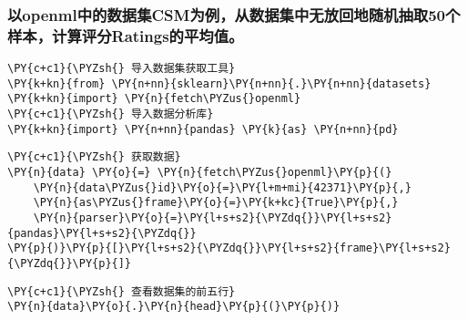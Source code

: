     \hypertarget{ux4ee5openmlux4e2dux7684ux6570ux636eux96c6csmux4e3aux4f8bux4eceux6570ux636eux96c6ux4e2dux65e0ux653eux56deux5730ux968fux673aux62bdux53d650ux4e2aux6837ux672cux8ba1ux7b97ux8bc4ux5206ratingsux7684ux5e73ux5747ux503c}{%
\subsubsection{以openml中的数据集CSM为例，从数据集中无放回地随机抽取50个样本，计算评分Ratings的平均值。}\label{ux4ee5openmlux4e2dux7684ux6570ux636eux96c6csmux4e3aux4f8bux4eceux6570ux636eux96c6ux4e2dux65e0ux653eux56deux5730ux968fux673aux62bdux53d650ux4e2aux6837ux672cux8ba1ux7b97ux8bc4ux5206ratingsux7684ux5e73ux5747ux503c}}

    \begin{tcolorbox}[breakable, size=fbox, boxrule=1pt, pad at break*=1mm,colback=cellbackground, colframe=cellborder]
\begin{Verbatim}[commandchars=\\\{\}]
\PY{c+c1}{\PYZsh{} 导入数据集获取工具}
\PY{k+kn}{from} \PY{n+nn}{sklearn}\PY{n+nn}{.}\PY{n+nn}{datasets} \PY{k+kn}{import} \PY{n}{fetch\PYZus{}openml}
\PY{c+c1}{\PYZsh{} 导入数据分析库}
\PY{k+kn}{import} \PY{n+nn}{pandas} \PY{k}{as} \PY{n+nn}{pd}
\end{Verbatim}
\end{tcolorbox}

    \begin{tcolorbox}[breakable, size=fbox, boxrule=1pt, pad at break*=1mm,colback=cellbackground, colframe=cellborder]
\begin{Verbatim}[commandchars=\\\{\}]
\PY{c+c1}{\PYZsh{} 获取数据}
\PY{n}{data} \PY{o}{=} \PY{n}{fetch\PYZus{}openml}\PY{p}{(}
    \PY{n}{data\PYZus{}id}\PY{o}{=}\PY{l+m+mi}{42371}\PY{p}{,}
    \PY{n}{as\PYZus{}frame}\PY{o}{=}\PY{k+kc}{True}\PY{p}{,}
    \PY{n}{parser}\PY{o}{=}\PY{l+s+s2}{\PYZdq{}}\PY{l+s+s2}{pandas}\PY{l+s+s2}{\PYZdq{}}
\PY{p}{)}\PY{p}{[}\PY{l+s+s2}{\PYZdq{}}\PY{l+s+s2}{frame}\PY{l+s+s2}{\PYZdq{}}\PY{p}{]}
\end{Verbatim}
\end{tcolorbox}

    \begin{tcolorbox}[breakable, size=fbox, boxrule=1pt, pad at break*=1mm,colback=cellbackground, colframe=cellborder]
\begin{Verbatim}[commandchars=\\\{\}]
\PY{c+c1}{\PYZsh{} 查看数据集的前五行}
\PY{n}{data}\PY{o}{.}\PY{n}{head}\PY{p}{(}\PY{p}{)}
\end{Verbatim}
\end{tcolorbox}


